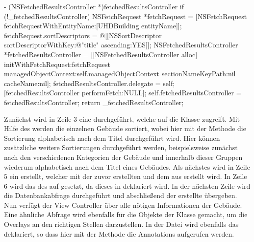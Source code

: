 \documentclass{report}
\begin{document}
\begin{objclst}
- (NSFetchedResultsController *)fetchedResultsController {
    if (!_fetchedResultsController) {
        NSFetchRequest *fetchRequest = [NSFetchRequest fetchRequestWithEntityName:[UHDBuilding entityName]];
        fetchRequest.sortDescriptors = @[[NSSortDescriptor sortDescriptorWithKey:@"title" ascending:YES]];
        NSFetchedResultsController *fetchedResultsController = [[NSFetchedResultsController alloc] initWithFetchRequest:fetchRequest managedObjectContext:self.managedObjectContext sectionNameKeyPath:nil cacheName:nil];
        fetchedResultsController.delegate = self;
        [fetchedResultsController performFetch:NULL];
        self.fetchedResultsController = fetchedResultsController;
    }
    return _fetchedResultsController;
}
\end{objclst}

Zunächst wird in Zeile $3$ eine  durchgeführt, welche auf die Klasse  zugreift. Mit Hilfe des  werden die einzelnen Gebäude sortiert, wobei hier mit der Methode  die Sortierung alphabetisch nach dem Titel durchgeführt wird. Hier können zusätzliche weitere Sortierungen durchgeführt werden, beispielsweise zunächst nach den verschiedenen Kategorien der Gebäude und innerhalb dieser Gruppen wiederum alphabetisch nach dem Titel eines Gebäudes. Als nächstes wird in Zeile $5$ ein  erstellt, welcher mit der zuvor erstellten  und dem  aus  erstellt wird. In Zeile $6$ wird das  des  auf  gesetzt, da dieses in  deklariert wird. In der nächsten Zeile wird die Datenbankabfrage durchgeführt und abschließend der erstellte  übergeben. Nun verfügt der View Controller über alle nötigen Informationen der Gebäude. Eine ähnliche Abfrage wird ebenfalls für die Objekte der Klasse  gemacht, um die Overlays an den richtigen Stellen darzustellen. In der Datei  wird ebenfalls das  deklariert, so dass hier mit der Methode  die Annotations aufgerufen werden.
\end{document}
